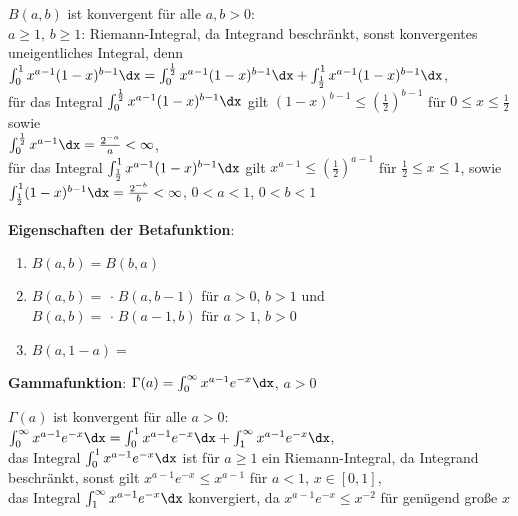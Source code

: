 $B(a, b)$ ist konvergent für alle $a, b > 0$: \\
$a \ge 1$, $b \ge 1$: Riemann-Integral, da Integrand beschränkt,
sonst konvergentes uneigentliches Integral, denn
$\int_0^1 x^{a-1} (1 - x)^{b-1} \dx =
\int_0^{\frac{1}{2}} x^{a-1} (1 - x)^{b-1} \dx +
\int_{\frac{1}{2}}^1 x^{a-1} (1 - x)^{b-1} \dx$, \\
für das Integral $\int_0^{\frac{1}{2}} x^{a-1} (1 - x)^{b-1} \dx$
gilt $(1 - x)^{b-1} \le \left(\frac{1}{2}\right)^{b-1}$ für
$0 \le x \le \frac{1}{2}$ sowie \\
$\int_0^{\frac{1}{2}} x^{a-1} \dx = \frac{2^{-a}}{a} < \infty$, \\
für das Integral $\int_{\frac{1}{2}}^1 x^{a-1} (1 - x)^{b-1} \dx$
gilt $x^{a-1} \le \left(\frac{1}{2}\right)^{a-1}$ für
$\frac{1}{2} \le x \le 1$, sowie \\
$\int_{\frac{1}{2}}^1 (1 - x)^{b-1} \dx =
\frac{2^{-b}}{b} < \infty$, $0 < a < 1$, $0 < b < 1$

\textbf{Eigenschaften der Betafunktion}:
\begin{enumerate}
    \item
    $B(a, b) = B(b, a)$
    
    \item
    $B(a, b) =$
     $\cdot\; B(a, b - 1)$
    für $a > 0$, $b > 1$ und \\
    $B(a, b) =$
     $\cdot\; B(a - 1, b)$
    für $a > 1$, $b > 0$
    
    \item
    $B(a, 1 - a) =$
\end{enumerate}

\linie

\textbf{Gammafunktion}:
$\Gamma(a) = \int_0^\infty x^{a-1} e^{-x} \dx$, $a > 0$

$\Gamma(a)$ ist konvergent für alle $a > 0$: \\
$\int_0^\infty x^{a-1} e^{-x} \dx = \int_0^1 x^{a-1} e^{-x} \dx +
\int_1^\infty x^{a-1} e^{-x} \dx$, \\
das Integral $\int_0^1 x^{a-1} e^{-x} \dx$ ist für
$a \ge 1$ ein Riemann-Integral, da Integrand beschränkt,
sonst gilt $x^{a-1} e^{-x} \le x^{a-1}$ für $a < 1$, $x \in [0,1]$, \\
das Integral $\int_1^\infty x^{a-1} e^{-x} \dx$ konvergiert, da
$x^{a-1} e^{-x} \le x^{-2}$ für genügend große $x$


